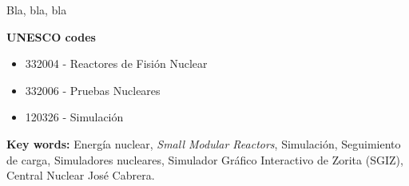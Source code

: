 \documentclass[a4paper, 11pt, english, twoside]{article}
\begin{document}
Bla, bla, bla

\vspace{0.6cm}
\textbf{UNESCO codes}
    \begin{itemize}
        \item 332004 - Reactores de Fisión Nuclear
        \item 332006 - Pruebas Nucleares
        \item 120326 - Simulación
    \end{itemize}

 \textbf{Key words:} Energía nuclear, \textit{Small Modular Reactors}, Simulación, Seguimiento de carga, Simuladores nucleares, Simulador Gráfico Interactivo de Zorita (SGIZ), Central Nuclear José Cabrera.



\afterpage{\blankpage} %


\newpage
\renewcommand*\contentsname{INDEX} %
\tableofcontents %
\afterpage{\blankpage} %

\newpage
{}



\end{document}
